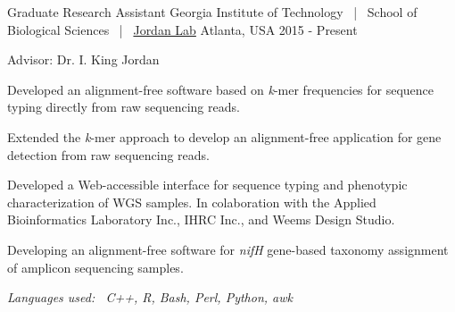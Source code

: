 



\begin{cventries}
\cventry
{Graduate Research Assistant} %
{Georgia Institute of Technology {\normalfont ~|~ School of Biological Sciences} {\normalfont ~|~ \href{http://jordan.biology.gatech.edu}{Jordan Lab}}} %
{Atlanta, USA} %
{2015 - Present} %
{ %
Advisor: Dr. I. King Jordan\newline
\vspace{2.0mm}
\textit{}
\vspace{\acvDescAfterDutiesSkip}
\begin{cvitems}
\item {Developed an alignment-free software based on \textit{k}-mer frequencies for sequence typing directly from raw sequencing reads.}
\item {Extended the \textit{k}-mer approach to develop an alignment-free application for gene detection from raw sequencing reads.}
\item {Developed a Web-accessible interface for sequence typing and phenotypic characterization of WGS samples. In colaboration with the Applied Bioinformatics Laboratory Inc., IHRC Inc., and Weems Design Studio.}
\item {Developing an alignment-free software for \textit{nifH} gene-based taxonomy assignment of amplicon sequencing samples.}
\end{cvitems}
\vspace{\acvDescAfterDutiesSkip}
\textit{Languages used:~ C++, R, Bash, Perl, Python, awk}
}


\end{cventries}
